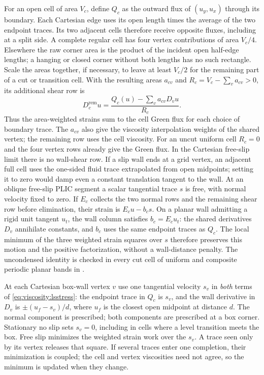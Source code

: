 For an open cell of area $V_c$, define $Q_c$ as the outward flux of
$(u_y,u_x)$ through its boundary. Each Cartesian edge uses its open length
times the average of the two endpoint traces. Its two adjacent cells
therefore receive opposite fluxes, including at a split side. A complete
regular cell has four vertex contributions of area $V_c/4$. Elsewhere the
raw corner area is the product of the incident open half-edge lengths; a
hanging or closed corner without both lengths has no such rectangle.
Scale the areas together, if necessary, to leave at least $V_c/2$ for the
remaining part of a cut or transition cell. With the resulting areas $a_{cv}$
and $R_c=V_c-\sum_v a_{cv}>0$, its additional shear row is
\begin{equation}
    D_c^{\mathrm{rem}}u =
    \frac{Q_c(u)-\sum_v a_{cv}D_vu}{R_c}.
    \label{eq:viscosity:lsstress}
\end{equation}
Thus the area-weighted strains sum to the cell Green flux for each choice
of boundary trace. The $a_{cv}$ also give the viscosity interpolation weights
of the shared vertex; the remaining row uses the cell viscosity.
For an uncut uniform cell $R_c=0$ and the
four vertex rows already give the Green flux. In the Cartesian free-slip
limit there is no wall-shear row. If a slip wall ends at a grid vertex,
an adjacent full cell uses the one-sided fluid trace extrapolated from open
midpoints; setting it to zero would damp even a constant translation
tangent to the wall. At an oblique free-slip PLIC segment a scalar
tangential trace $s$ is free, with normal velocity fixed to zero. If $E_c$
collects the two normal rows and the remaining shear row before elimination,
their strain is $E_c u-b_c s$. On a planar wall admitting a rigid unit
tangent $u_t$, the wall column satisfies $b_c=E_c u_t$: the shared
derivatives $D_v$ annihilate constants, and $b_c$ uses the same endpoint
traces as $Q_c$. The local minimum of the three weighted strain squares over
$s$ therefore preserves this motion and the positive factorization, without
a wall-distance penalty. The uncondensed identity is checked in every cut
cell of uniform and composite periodic planar bands in
.

At each Cartesian box-wall vertex $v$ use one tangential velocity $s_v$ in
\emph{both} terms of \cref{eq:viscosity:lsstress}: the endpoint trace in
$Q_c$ is $s_v$, and the wall derivative in $D_v$ is
$\pm(u_f-s_v)/d$, where $u_f$ is the closest open midpoint at distance $d$.
The normal component is prescribed; both components are prescribed at a box
corner. Stationary no slip sets $s_v=0$, including in cells where a level
transition meets the box. Free slip minimizes the weighted strain work over
the $s_v$. A trace seen only by its vertex releases that square. If several
traces enter one completion, their minimization is coupled; the cell and
vertex viscosities need not agree, so the minimum is updated when they change.

